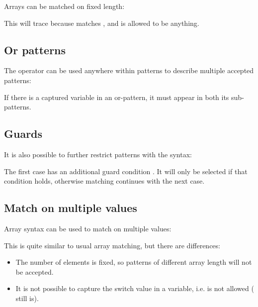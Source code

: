 Arrays can be matched on fixed length:


This will trace  because  matches , and  is allowed to be anything.

\subsection{Or patterns}
\label{lf-pattern-matching-or}

The \expr{|} operator can be used anywhere within patterns to describe multiple accepted patterns:


If there is a captured variable in an or-pattern, it must appear in both its sub-patterns.

\subsection{Guards}
\label{lf-pattern-matching-guards}

It is also possible to further restrict patterns with the  syntax:


The first case has an additional guard condition . It will only be selected if that condition holds, otherwise matching continues with the next case.

\subsection{Match on multiple values}
\label{lf-pattern-matching-tuples}

Array syntax can be used to match on multiple values:


This is quite similar to usual array matching, but there are differences:

\begin{itemize}
	\item The number of elements is fixed, so patterns of different array length will not be accepted.
	\item It is not possible to capture the switch value in a variable, i.e.  is not allowed ( still is).
\end{itemize}




